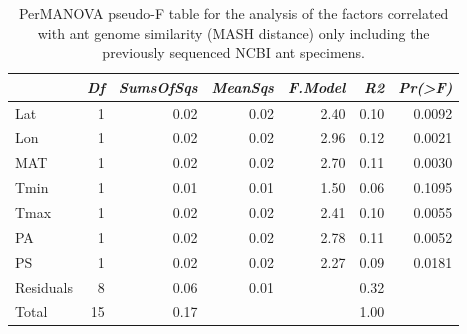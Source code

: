 \begin{table}[ht]
\centering
\begin{tabular}{lrrrrrr}
  \hline
 & {\emph{Df}} & {\emph{SumsOfSqs}} & {\emph{MeanSqs}} & {\emph{F.Model}} & {\emph{R2}} & {\emph{Pr(>F)}} \\ 
  \hline
Lat & 1 & 0.02 & 0.02 & 2.40 & 0.10 & 0.0092 \\ 
  Lon & 1 & 0.02 & 0.02 & 2.96 & 0.12 & 0.0021 \\ 
  MAT & 1 & 0.02 & 0.02 & 2.70 & 0.11 & 0.0030 \\ 
  Tmin & 1 & 0.01 & 0.01 & 1.50 & 0.06 & 0.1095 \\ 
  Tmax & 1 & 0.02 & 0.02 & 2.41 & 0.10 & 0.0055 \\ 
  PA & 1 & 0.02 & 0.02 & 2.78 & 0.11 & 0.0052 \\ 
  PS & 1 & 0.02 & 0.02 & 2.27 & 0.09 & 0.0181 \\ 
  Residuals & 8 & 0.06 & 0.01 &  & 0.32 &  \\ 
  Total & 15 & 0.17 &  &  & 1.00 &  \\ 
   \hline
\end{tabular}
\caption{PerMANOVA pseudo-F table for the analysis of the factors 
correlated with ant genome similarity (MASH distance) only including the 
previously sequenced NCBI ant specimens.} 
\label{tab:perm_mash_napg}
\end{table}
